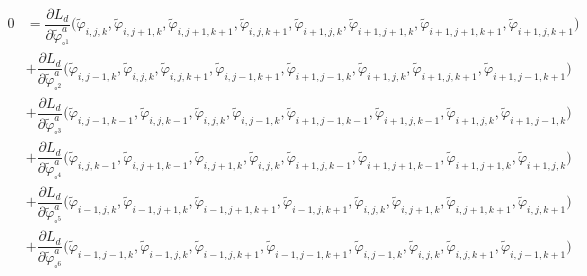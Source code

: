 \documentclass[12pt,a4paper,reqno]{article}
\begin{document}
\begin{align}
0
\nonumber
&= \dfrac{\partial L_d}{\partial \tilde{\ensuremath{\varphi}}^{a}_{\square^1}} \Big( \tilde{\ensuremath{\varphi}}_{i,  j,  k  }, \tilde{\ensuremath{\varphi}}_{i,  j+1,k  }, \tilde{\ensuremath{\varphi}}_{i,  j+1,k+1}, \tilde{\ensuremath{\varphi}}_{i,  j,  k+1}, \tilde{\ensuremath{\varphi}}_{i+1,j,  k  }, \tilde{\ensuremath{\varphi}}_{i+1,j+1,k  }, \tilde{\ensuremath{\varphi}}_{i+1,j+1,k+1}, \tilde{\ensuremath{\varphi}}_{i+1,j,  k+1} \Big) \\
\nonumber
&+ \dfrac{\partial L_d}{\partial \tilde{\ensuremath{\varphi}}^{a}_{\square^2}} \Big( \tilde{\ensuremath{\varphi}}_{i,  j-1,k  }, \tilde{\ensuremath{\varphi}}_{i,  j,  k  }, \tilde{\ensuremath{\varphi}}_{i,  j,  k+1}, \tilde{\ensuremath{\varphi}}_{i,  j-1,k+1}, \tilde{\ensuremath{\varphi}}_{i+1,j-1,k  }, \tilde{\ensuremath{\varphi}}_{i+1,j,  k  }, \tilde{\ensuremath{\varphi}}_{i+1,j,  k+1}, \tilde{\ensuremath{\varphi}}_{i+1,j-1,k+1} \Big) \\
\nonumber
&+ \dfrac{\partial L_d}{\partial \tilde{\ensuremath{\varphi}}^{a}_{\square^3}} \Big( \tilde{\ensuremath{\varphi}}_{i,  j-1,k-1}, \tilde{\ensuremath{\varphi}}_{i,  j,  k-1}, \tilde{\ensuremath{\varphi}}_{i,  j,  k  }, \tilde{\ensuremath{\varphi}}_{i,  j-1,k  }, \tilde{\ensuremath{\varphi}}_{i+1,j-1,k-1}, \tilde{\ensuremath{\varphi}}_{i+1,j,  k-1}, \tilde{\ensuremath{\varphi}}_{i+1,j,  k  }, \tilde{\ensuremath{\varphi}}_{i+1,j-1,k  } \Big) \\
\nonumber
&+ \dfrac{\partial L_d}{\partial \tilde{\ensuremath{\varphi}}^{a}_{\square^4}} \Big( \tilde{\ensuremath{\varphi}}_{i,  j  ,k-1}, \tilde{\ensuremath{\varphi}}_{i,  j+1,k-1}, \tilde{\ensuremath{\varphi}}_{i,  j+1,k  }, \tilde{\ensuremath{\varphi}}_{i,  j,  k  }, \tilde{\ensuremath{\varphi}}_{i+1,j,  k-1}, \tilde{\ensuremath{\varphi}}_{i+1,j+1,k-1}, \tilde{\ensuremath{\varphi}}_{i+1,j+1,k  }, \tilde{\ensuremath{\varphi}}_{i+1,j,  k  } \Big) \\
\nonumber
&+ \dfrac{\partial L_d}{\partial \tilde{\ensuremath{\varphi}}^{a}_{\square^5}} \Big( \tilde{\ensuremath{\varphi}}_{i-1,j,  k  }, \tilde{\ensuremath{\varphi}}_{i-1,j+1,k  }, \tilde{\ensuremath{\varphi}}_{i-1,j+1,k+1}, \tilde{\ensuremath{\varphi}}_{i-1,j,  k+1}, \tilde{\ensuremath{\varphi}}_{i,  j,  k  }, \tilde{\ensuremath{\varphi}}_{i,  j+1,k  }, \tilde{\ensuremath{\varphi}}_{i,  j+1,k+1}, \tilde{\ensuremath{\varphi}}_{i,  j,  k+1} \Big) \\
\nonumber
&+ \dfrac{\partial L_d}{\partial \tilde{\ensuremath{\varphi}}^{a}_{\square^6}} \Big( \tilde{\ensuremath{\varphi}}_{i-1,j-1,k  }, \tilde{\ensuremath{\varphi}}_{i-1,j,  k  }, \tilde{\ensuremath{\varphi}}_{i-1,j,  k+1}, \tilde{\ensuremath{\varphi}}_{i-1,j-1,k+1}, \tilde{\ensuremath{\varphi}}_{i,  j-1,k  }, \tilde{\ensuremath{\varphi}}_{i,  j,  k  }, \tilde{\ensuremath{\varphi}}_{i,  j,  k+1}, \tilde{\ensuremath{\varphi}}_{i,  j-1,k+1} \Big) \\

\end{align}
\end{document}
